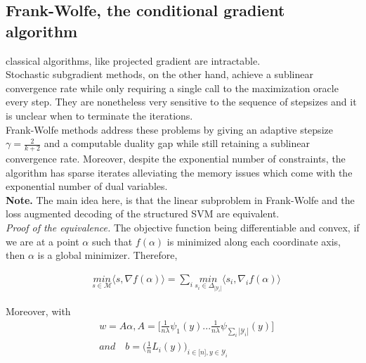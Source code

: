 \subsection{Frank-Wolfe, the conditional gradient algorithm}
classical algorithms, like projected gradient are intractable. \\
Stochastic subgradient methods, on the other hand, achieve a sublinear
convergence rate while only requiring a single call to the maximization oracle
every step. They are nonetheless very sensitive to the sequence of stepsizes and
it is unclear when to terminate the iterations. \\

Frank-Wolfe methods address these problems by giving an adaptive stepsize
$\gamma= \frac{2}{k+2}$ and a computable duality gap while still retaining a
sublinear convergence rate. Moreover, despite the exponential number of
constraints, the algorithm has sparse iterates alleviating the memory issues
which come with the exponential number of dual variables.\\
\textbf{Note.} The main idea here, is that the linear subproblem in Frank-Wolfe
and the loss augmented decoding of the structured SVM are equivalent. \\

\textit{Proof of the equivalence.} The objective function being differentiable
and convex, if we are at a point $\alpha$ such that $f(\alpha)$ is minimized
along each coordinate axis, then $\alpha$ is
a global minimizer. Therefore,

\begin{align}
    &\underset{s\in\mathcal{M}}{\textit{min}}\langle s, \nabla f(\alpha)\rangle
= \sum_{i}\underset{s_{i}\in\Delta_{|\mathcal{Y}_{i}|}}{\textit{min}}\langle
s_{i}, \nabla_{i} f(\alpha)\rangle
\end{align}

Moreover, with
\begin{align*}
   &w=A\alpha, A=\Big[\frac{1}{n\lambda}\psi_{1}(y)...\frac{1}{n\lambda}\psi_{\sum_{i}|\mathcal{Y}_{i}|}(y)\Big]\\
   &\textit{and}\quad b=\Big(\frac{1}{n}L_{i}(y)\Big)_{i\in\big[n\big],y\in\mathcal{Y}_{i}}
\end{align*}

